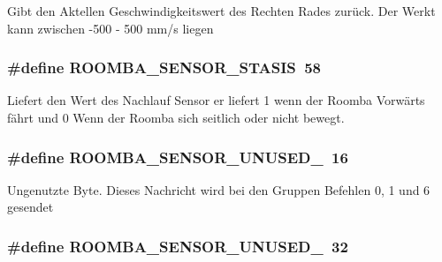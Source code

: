 Gibt den Aktellen Geschwindigkeitswert des Rechten Rades zurück. Der Werkt kann zwischen -\/500 -\/ 500 mm/s liegen \hypertarget{group__roomba__sensor__extern_gad7992ba545cbb126b26e0123e84644a9}{
\subsubsection[{R\-O\-O\-M\-B\-A\-\_\-\-S\-E\-N\-S\-O\-R\-\_\-\-S\-T\-A\-S\-I\-S}]{\setlength{\rightskip}{0pt plus 5cm}\#define R\-O\-O\-M\-B\-A\-\_\-\-S\-E\-N\-S\-O\-R\-\_\-\-S\-T\-A\-S\-I\-S~58}}\label{group__roomba__sensor__extern_gad7992ba545cbb126b26e0123e84644a9}
Liefert den Wert des Nachlauf Sensor er liefert 1 wenn der Roomba Vorwärts fährt und 0 Wenn der Roomba sich seitlich oder nicht bewegt. \hypertarget{group__roomba__sensor__extern_gafeaaaef2638094e3785fa4e1388b17f7}{
\subsubsection[{R\-O\-O\-M\-B\-A\-\_\-\-S\-E\-N\-S\-O\-R\-\_\-\-U\-N\-U\-S\-E\-D\-\_\-1}]{\setlength{\rightskip}{0pt plus 5cm}\#define R\-O\-O\-M\-B\-A\-\_\-\-S\-E\-N\-S\-O\-R\-\_\-\-U\-N\-U\-S\-E\-D\-\_~16}}\label{group__roomba__sensor__extern_gafeaaaef2638094e3785fa4e1388b17f7}
Ungenutzte Byte. Dieses Nachricht wird bei den Gruppen Befehlen 0, 1 und 6 gesendet \hypertarget{group__roomba__sensor__extern_ga7e1760bf821a8181020bc860561b6e72}{
\subsubsection[{R\-O\-O\-M\-B\-A\-\_\-\-S\-E\-N\-S\-O\-R\-\_\-\-U\-N\-U\-S\-E\-D\-\_\-2}]{\setlength{\rightskip}{0pt plus 5cm}\#define R\-O\-O\-M\-B\-A\-\_\-\-S\-E\-N\-S\-O\-R\-\_\-\-U\-N\-U\-S\-E\-D\-\_~32}}\label{group__roomba__sensor__extern_ga7e1760bf821a8181020bc860561b6e72}
